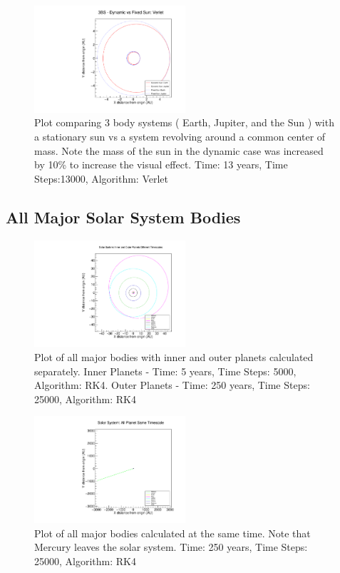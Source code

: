\documentclass[a4paper,12pt]{report}
\begin{document}
 
  \begin{figure}
 \centering
   \includegraphics[width=0.5\textwidth]{ESJD_vs_ESJF_Verlet.pdf}
  \caption{Plot comparing 3 body systems ( Earth, Jupiter, and the Sun ) with a stationary sun vs a system revolving around a common center of mass. Note the mass of the sun in the dynamic case was increased by 10\% to increase the visual effect. Time: 13 years, Time Steps:13000, Algorithm: Verlet}
  \label{fig:ESJD_vs_ESJF_Verlet}
 \end{figure}

\subsection{All Major Solar System Bodies}

  \begin{figure}
 \centering
   \includegraphics[width=0.5\textwidth]{all_bodies_inner_outer_sep_RK4.pdf}
  \caption{Plot of all major bodies with inner and outer planets calculated separately. Inner Planets - Time: 5 years, Time Steps: 5000, Algorithm: RK4. Outer Planets - Time: 250 years, Time Steps: 25000, Algorithm: RK4}
  \label{fig:all_bodies_inner_outer_sep_RK4}
 \end{figure}

 \begin{figure}
 \centering
   \includegraphics[width=0.5\textwidth]{all_bodies_same_time_RK4.pdf}
  \caption{Plot of all major bodies calculated at the same time. Note that Mercury leaves the solar system. Time: 250 years, Time Steps: 25000, Algorithm: RK4}
  \label{fig:all_bodies_same_time_RK4}
 \end{figure}
 
\end{document}
